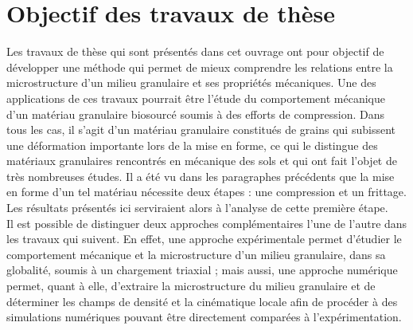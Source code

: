 \section*{Objectif des travaux de thèse}
Les travaux de thèse qui sont présentés dans cet ouvrage ont pour objectif de développer une méthode qui permet de mieux comprendre les relations entre la microstructure d'un milieu granulaire et ses propriétés mécaniques. Une des applications de ces travaux pourrait être l'étude du comportement mécanique d'un matériau granulaire biosourcé soumis à des efforts de compression. Dans tous les cas, il s'agit d'un matériau granulaire constitués de grains qui subissent une déformation importante lors de la mise en forme, ce qui le distingue des matériaux granulaires rencontrés en mécanique des sols et qui ont fait l'objet de très nombreuses études. Il a été vu dans les paragraphes précédents que la mise en forme d'un tel matériau nécessite deux étapes : une compression et un frittage. Les résultats présentés ici serviraient alors à l'analyse de cette première étape.
\\Il est possible de distinguer deux approches complémentaires l'une de l'autre dans les travaux qui suivent. En effet, une approche expérimentale permet d'étudier le comportement mécanique et la microstructure d'un milieu granulaire, dans sa globalité, soumis à un chargement triaxial ; mais aussi, une approche numérique permet, quant à elle, d'extraire la microstructure du milieu granulaire et de déterminer les champs de densité et la cinématique locale afin de procéder à des simulations numériques pouvant être directement comparées à l'expérimentation.
